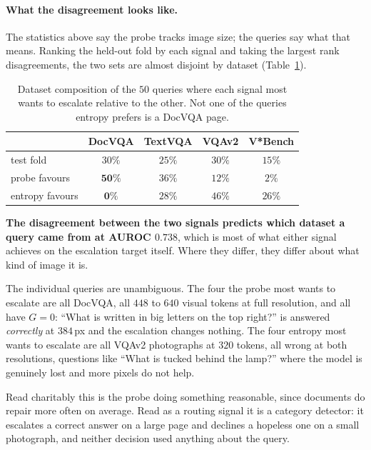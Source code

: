 \documentclass[10pt,twocolumn]{article}
\theoremstyle{plain}
\begin{document}
\paragraph{What the disagreement looks like.} The statistics above say the probe
tracks image size; the queries say what that means. Ranking the held-out fold by
each signal and taking the largest rank disagreements, the two sets are almost
disjoint by dataset (Table~\ref{tab:disagree}).

\begin{table}[t]
\centering\small
\setlength{\tabcolsep}{4pt}
\begin{tabular}{lcccc}
\toprule
& DocVQA & TextVQA & VQAv2 & V*Bench \\
\midrule
test fold & $30\%$ & $25\%$ & $30\%$ & $15\%$ \\
probe favours & $\mathbf{50\%}$ & $36\%$ & $12\%$ & $2\%$ \\
entropy favours & $\mathbf{0\%}$ & $28\%$ & $46\%$ & $26\%$ \\
\bottomrule
\end{tabular}
\caption{Dataset composition of the $50$ queries where each signal most wants to
escalate relative to the other. Not one of the queries entropy prefers is a
DocVQA page.}
\label{tab:disagree}
\end{table}

\textbf{The disagreement between the two signals predicts which dataset a query
came from at AUROC $0.738$}, which is most of what either signal achieves on the
escalation target itself. Where they differ, they differ about what kind of
image it is.

The individual queries are unambiguous. The four the probe most wants to
escalate are all DocVQA, all $448$ to $640$ visual tokens at full resolution,
and all have $G = 0$: ``What is written in big letters on the top right?'' is
answered \emph{correctly} at $384$\,px and the escalation changes nothing. The
four entropy most wants to escalate are all VQAv2 photographs at $320$ tokens,
all wrong at both resolutions, questions like ``What is tucked behind the
lamp?'' where the model is genuinely lost and more pixels do not help.

Read charitably this is the probe doing something reasonable, since documents do
repair more often on average. Read as a routing signal it is a category
detector: it escalates a correct answer on a large page and declines a hopeless
one on a small photograph, and neither decision used anything about the query.
\end{document}
